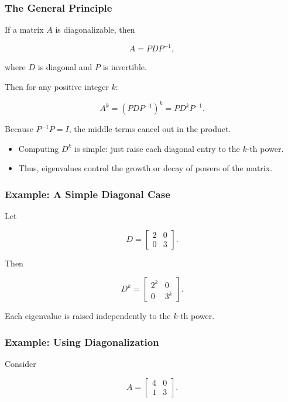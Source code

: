 \documentclass[
  letterpaper,
  DIV=11,
  numbers=noendperiod]{scrreprt}
\providecommand{\tightlist}{%
  \setlength{\itemsep}{0pt}\setlength{\parskip}{0pt}}
\begin{document}
\subsubsection{The General Principle}\label{the-general-principle}

If a matrix \(A\) is diagonalizable, then

\[
A = P D P^{-1},
\]

where \(D\) is diagonal and \(P\) is invertible.

Then for any positive integer \(k\):

\[
A^k = (P D P^{-1})^k = P D^k P^{-1}.
\]

Because \(P^{-1}P = I\), the middle terms cancel out in the product.

\begin{itemize}
\tightlist
\item
  Computing \(D^k\) is simple: just raise each diagonal entry to the
  \(k\)-th power.
\item
  Thus, eigenvalues control the growth or decay of powers of the matrix.
\end{itemize}

\subsubsection{Example: A Simple Diagonal
Case}\label{example-a-simple-diagonal-case}

Let

\[
D = \begin{bmatrix} 2 & 0 \\ 0 & 3 \end{bmatrix}.
\]

Then

\[
D^k = \begin{bmatrix} 2^k & 0 \\ 0 & 3^k \end{bmatrix}.
\]

Each eigenvalue is raised independently to the \(k\)-th power.

\subsubsection{Example: Using
Diagonalization}\label{example-using-diagonalization}

Consider

\[
A = \begin{bmatrix} 4 & 0 \\ 1 & 3 \end{bmatrix}.
\]
\end{document}
